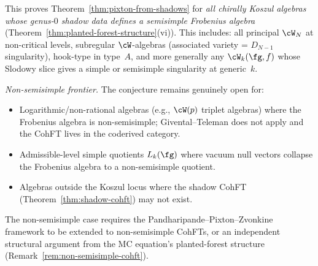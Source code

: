 \begin{remark}
This proves Theorem~\ref{thm:pixton-from-shadows} for
\emph{all chirally Koszul algebras whose genus-$0$ shadow data
defines a semisimple Frobenius algebra}
(Theorem~\ref{thm:planted-forest-structure}(vi)).
This includes: all principal $\cW_N$ at non-critical levels,
subregular $\cW$-algebras
(associated variety = $D_{N-1}$ singularity), hook-type
in type~$A$, and more generally any $\cW_k(\fg,f)$ whose
Slodowy slice gives a simple or semisimple singularity at
generic~$k$.

\emph{Non-semisimple frontier.}
The conjecture remains genuinely open for:
\begin{itemize}[nosep]
\item
 Logarithmic/non-rational algebras (e.g., $\cW(p)$ triplet algebras)
 where the Frobenius algebra is non-semisimple;
 Givental--Teleman does not apply and the CohFT lives in the
 coderived category.
\item
 Admissible-level simple quotients $L_k(\fg)$ where vacuum null
 vectors collapse the Frobenius algebra to a non-semisimple quotient.
\item
 Algebras outside the Koszul locus where the shadow CohFT
 (Theorem~\ref{thm:shadow-cohft}) may not exist.
\end{itemize}
The non-semisimple case requires the
Pandharipande--Pixton--Zvonkine framework to be extended to
non-semisimple CohFTs, or an independent structural argument from
the MC equation's planted-forest structure
(Remark~\ref{rem:non-semisimple-cohft}).
\end{remark}

